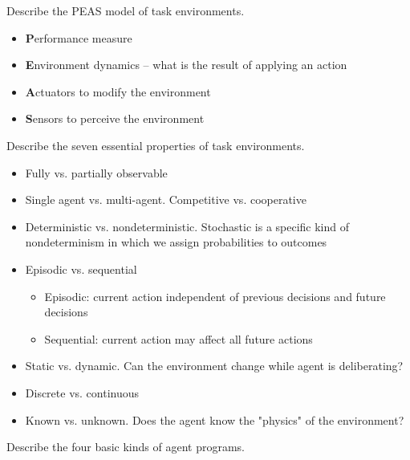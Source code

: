 \begin{questions}

\question Describe the PEAS model of task environments.

\begin{solution}[3in]
\begin{itemize}
\item {\bf P}erformance measure
\item {\bf E}nvironment dynamics -- what is the result of applying an action
\item {\bf A}ctuators to modify the environment
\item {\bf S}ensors to perceive the environment
\end{itemize}
\end{solution}

\question Describe the seven essential properties of task environments.

\begin{solution}[4in]

\begin{itemize}
\item  Fully vs. partially observable
\item  Single agent vs. multi-agent.  Competitive vs. cooperative
\item  Deterministic vs. nondeterministic.  Stochastic is a specific kind of nondeterminism in which we assign probabilities to outcomes
\item  Episodic vs. sequential
    \begin{itemize}
    \item  Episodic: current action independent of previous decisions and future decisions
    \item  Sequential: current action may affect all future actions
    \end{itemize}
\item  Static vs. dynamic.  Can the environment change while agent is deliberating?
\item  Discrete vs. continuous
\item  Known vs. unknown.  Does the agent know the "physics" of the environment?
\end{itemize}

\end{solution}

\newpage

\question Describe the four basic kinds of agent programs.


\end{questions}
